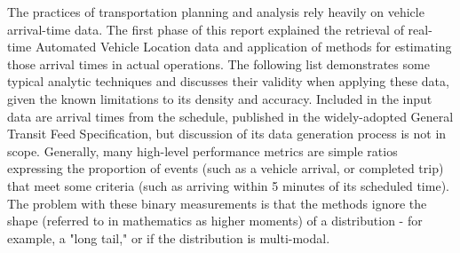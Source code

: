 \documentclass[12pt]{report}
\begin{document}
The practices of transportation planning and analysis rely heavily on vehicle arrival-time data. The first phase of this report explained the retrieval of real-time Automated Vehicle Location data and application of methods for estimating those arrival times in actual operations. The following list demonstrates some typical analytic techniques and discusses their validity when applying these data, given the known limitations to its density and accuracy. Included in the input data are arrival times from the schedule, published in the widely-adopted General Transit Feed Specification, but discussion of its data generation process is not in scope. Generally, many high-level performance metrics are simple ratios expressing the proportion of events (such as a vehicle arrival, or completed trip) that meet some criteria (such as arriving within 5 minutes of its scheduled time). The problem with these binary measurements is that the methods ignore the shape (referred to in mathematics as higher moments) of a distribution - for example, a "long tail," or if the distribution is multi-modal.
\end{document}
